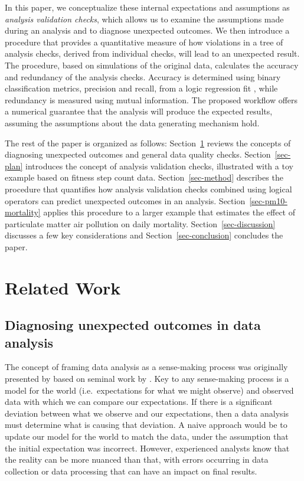 \documentclass[
  12pt,
]{interact}
\begin{document}
In this paper, we conceptualize these internal expectations and
assumptions as \emph{analysis validation checks}, which allows us to
examine the assumptions made during an analysis and to diagnose
unexpected outcomes. We then introduce a procedure that provides a
quantitative measure of how violations in a tree of analysis checks,
derived from individual checks, will lead to an unexpected result. The
procedure, based on simulations of the original data, calculates the
accuracy and redundancy of the analysis checks. Accuracy is determined
using binary classification metrics, precision and recall, from a logic
regression fit \citep{ruczinski_logic_2003}, while redundancy is
measured using mutual information. The proposed workflow offers a
numerical guarantee that the analysis will produce the expected results,
assuming the assumptions about the data generating mechanism hold.

The rest of the paper is organized as follows:
Section~\ref{sec-lit-review} reviews the concepts of diagnosing
unexpected outcomes and general data quality checks.
Section~\ref{sec-plan} introduces the concept of analysis validation
checks, illustrated with a toy example based on fitness step count data.
Section~\ref{sec-method} describes the procedure that quantifies how
analysis validation checks combined using logical operators can predict
unexpected outcomes in an analysis. Section~\ref{sec-pm10-mortality}
applies this procedure to a larger example that estimates the effect of
particulate matter air pollution on daily mortality.
Section~\ref{sec-discussion} discusses a few key considerations and
Section~\ref{sec-conclusion} concludes the paper.

\section{Related Work}\label{sec-lit-review}

\subsection{Diagnosing unexpected outcomes in data
analysis}\label{diagnosing-unexpected-outcomes-in-data-analysis}

The concept of framing data analysis as a sense-making process was
originally presented by \citep{grolemund_cognitive_2014} based on
seminal work by \citep{wild1999statistical}. Key to any sense-making
process is a model for the world (i.e.~expectations for what we might
observe) and observed data with which we can compare our expectations.
If there is a significant deviation between what we observe and our
expectations, then a data analysis must determine what is causing that
deviation. A naive approach would be to update our model for the world
to match the data, under the assumption that the initial expectation was
incorrect. However, experienced analysts know that the reality can be
more nuanced than that, with errors occurring in data collection or data
processing that can have an impact on final results.
\end{document}
